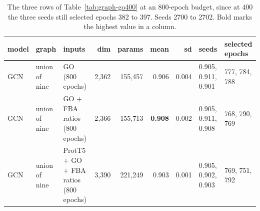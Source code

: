 \begin{table}[H]
  \centering
  \footnotesize
  \caption[Graph convolution on GO, 800 epochs]{The three rows of Table~\ref{tab:graph-go400} at an 800-epoch budget, since at 400 the three seeds still selected epochs 382 to 397. Seeds 2700 to 2702. Bold marks the highest value in a column.}
  \label{tab:graph-go800}
  \begin{tabular}{@{}lllrrrrll@{}}
    \hline
    model & graph & inputs & dim & params & mean & sd & seeds & selected epochs \\
    \hline
    GCN & union of nine & GO (800 epochs) & 2,362 & 155,457 & 0.906 & 0.004 & 0.905, 0.911, 0.901 & 777, 784, 788 \\
    GCN & union of nine & GO $+$ FBA ratios (800 epochs) & 2,366 & 155,713 & \textbf{0.908} & 0.002 & 0.905, 0.911, 0.908 & 768, 790, 769 \\
    GCN & union of nine & ProtT5 $+$ GO $+$ FBA ratios (800 epochs) & 3,390 & 221,249 & 0.903 & 0.001 & 0.905, 0.902, 0.903 & 769, 751, 792 \\
    \hline
  \end{tabular}
\end{table}
